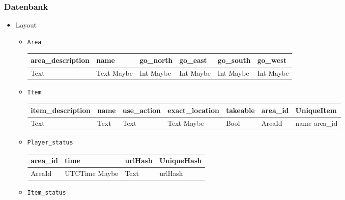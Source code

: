 \documentclass[hyperref={pdfpagelabels=false}]{beamer}
\begin{document}
\begin{frame}[fragile]
  \frametitle{Datenbank}
  \begin{itemize}
    \item Layout
      \begin{itemize}
        \item \verb|Area|
          {\tiny
            \begin{table}[!h]
              \begin{flushleft}
                \begin{tabular}{llllll}
                  area\_description & name & go\_north & go\_east & go\_south & go\_west \\ \hline
                  Text & Text Maybe & Int Maybe & Int Maybe & Int Maybe & Int Maybe
                \end{tabular}
              \end{flushleft}
            \end{table}
          }
        \item \verb|Item|
          {\tiny
            \begin{table}[!h]
              \begin{flushleft}
                \begin{tabular}{lllllll}
                  item\_description & name & use\_action & exact\_location & takeable & area\_id & UniqueItem \\ \hline
                  Text & Text & Text & Text Maybe & Bool & AreaId & name area\_id
                \end{tabular}
              \end{flushleft}
            \end{table}
          }
        \item \verb|Player_status|
          {\tiny
            \begin{table}[!h]
              \begin{flushleft}
                \begin{tabular}{llll}
                  area\_id & time & urlHash & UniqueHash \\ \hline
                  AreaId & UTCTime Maybe & Text & urlHash
                \end{tabular}
              \end{flushleft}
            \end{table}
          }
        \item \verb|Item_status|
          {\tiny
            \begin{table}[!h]

\end{table}}
\end{itemize}
\end{itemize}
\end{frame}
\end{document}
